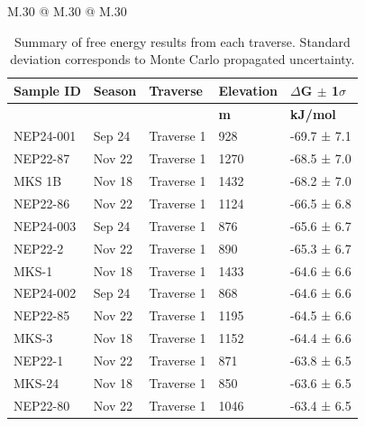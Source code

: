 


\begin{landscape}
    
    \begin{table}
        \caption{Summary of free energy results from each traverse. Standard deviation corresponds to Monte Carlo propagated uncertainty.}
        \label{tab:delta_G}
        \scriptsize  %
        \setlength\tabcolsep{2mm}
        \begin{tabular}{M{.30\textwidth} @{\hspace{4cm}} M{.30\textwidth} @{\hspace{4cm}} M{.30\textwidth}}
            \begin{tabular}{l l l l l}
    \textbf{Sample ID}  &  \textbf{Season}  &  \textbf{Traverse}  &  \textbf{Elevation}  &  \textbf{$\Delta$G $\pm$ 1$\sigma$} \\
    \hline
    &   &   &  \textbf{m}  &  \textbf{kJ/mol} \\
    \hline
    NEP24-001 & Sep 24 & Traverse 1 & 928 & -69.7 ±  7.1 \\
    NEP22-87 & Nov 22 & Traverse 1 & 1270 & -68.5 ±  7.0 \\
    MKS 1B & Nov 18 & Traverse 1 & 1432 & -68.2 ±  7.0 \\
    NEP22-86 & Nov 22 & Traverse 1 & 1124 & -66.5 ±  6.8 \\
    NEP24-003 & Sep 24 & Traverse 1 & 876 & -65.6 ±  6.7 \\
    NEP22-2 & Nov 22 & Traverse 1 & 890 & -65.3 ±  6.7 \\
    MKS-1 & Nov 18 & Traverse 1 & 1433 & -64.6 ±  6.6 \\
    NEP24-002 & Sep 24 & Traverse 1 & 868 & -64.6 ±  6.6 \\
    NEP22-85 & Nov 22 & Traverse 1 & 1195 & -64.5 ±  6.6 \\
    MKS-3 & Nov 18 & Traverse 1 & 1152 & -64.4 ±  6.6 \\
    NEP22-1 & Nov 22 & Traverse 1 & 871 & -63.8 ±  6.5 \\
    MKS-24 & Nov 18 & Traverse 1 & 850 & -63.6 ±  6.5 \\
    NEP22-80 & Nov 22 & Traverse 1 & 1046 & -63.4 ±  6.5 \\

\end{tabular}
\end{tabular}
\end{table}
\end{landscape}
